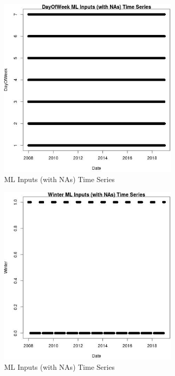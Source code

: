 \begin{figure} 
\centering  
\includegraphics[width=0.77\textwidth]{Code_Outputs/Report_ML_input_PM25_Step4_part_f_de_duplicated_aveswNAs_DayOfWeekvDate.jpg} 
\caption{\label{fig:Report_ML_input_PM25_Step4_part_f_de_duplicated_aveswNAsDayOfWeekvDate}ML Inputs (with NAs) Time Series} 
\end{figure} 
 

\begin{figure} 
\centering  
\includegraphics[width=0.77\textwidth]{Code_Outputs/Report_ML_input_PM25_Step4_part_f_de_duplicated_aveswNAs_WintervDate.jpg} 
\caption{\label{fig:Report_ML_input_PM25_Step4_part_f_de_duplicated_aveswNAsWintervDate}ML Inputs (with NAs) Time Series} 
\end{figure} 
 

